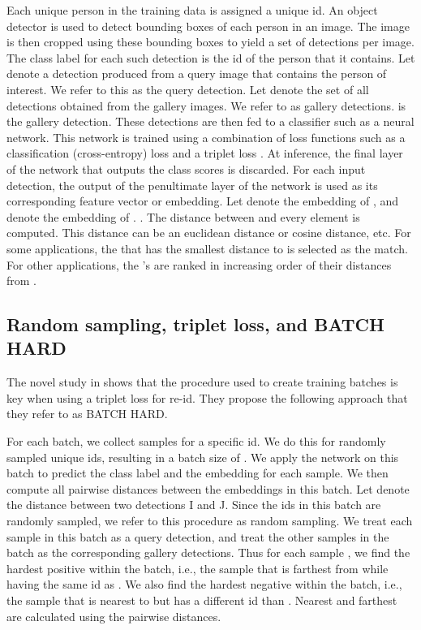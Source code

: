 \documentclass{article}
\begin{document}
Each unique person in the training data is assigned a unique id. An object detector is used to detect bounding boxes of each person in an image. The image is then cropped using these bounding boxes to yield a set of detections per image. The class label for each such detection is the id of the person that it contains. Let  denote a detection produced from a query image that contains the person of interest. We refer to this as the query detection. Let  denote the set of all detections obtained from the gallery images. We refer to  as gallery detections.  is the  gallery detection. These detections are then fed to a classifier such as a neural network. This network is trained using a combination of loss functions such as a classification (cross-entropy) loss and a triplet loss \cite{hermans2017defense}. At inference, the final layer of the network that outputs the class scores is discarded. For each input detection, the output of the penultimate layer of the network is used as its corresponding feature vector or embedding.  Let  denote the embedding of , and  denote the embedding of . . The distance between  and every element    is computed. This distance can be an euclidean distance or cosine distance, etc. For some applications, the  that has the smallest distance to  is selected as the match. For other applications, the 's are ranked in increasing order of their distances from . 

\subsection{Random sampling, triplet loss, and BATCH HARD}
\label{sec:triplet_batchhard}
The novel study in \cite{hermans2017defense} shows that the procedure used to create training batches is key when using a triplet loss for re-id. They propose the following approach that they refer to as BATCH HARD. 

For each batch, we collect  samples for a specific id. We do this for  randomly sampled unique ids, resulting in a batch size of . We apply the network on this batch to predict the class label and the embedding for each sample. We then compute all pairwise distances between the embeddings in this batch. Let  denote the distance between two detections I and J. Since the  ids in this batch are randomly sampled, we refer to this procedure as random sampling. We treat each sample in this batch as a query detection, and treat the other samples in the batch as the corresponding gallery detections. Thus for each sample , we find the hardest positive  within the batch, i.e., the sample that is farthest from  while having the same id as . We also find the hardest negative  within the batch, i.e., the sample that is nearest to  but has a different id than . Nearest and farthest are calculated using the pairwise distances. 
\end{document}
